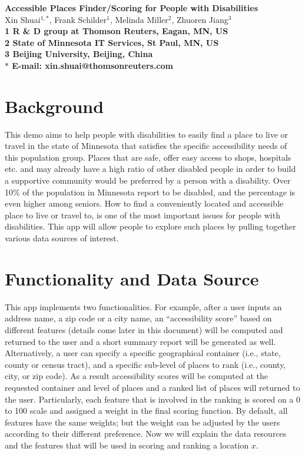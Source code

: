 \documentclass[10pt]{article}
\date{}
\begin{document}
\begin{flushleft}
{\Large
\textbf{Accessible Places Finder/Scoring for People with Disabilities}
}
\\
Xin Shuai$^{1,\ast}$,
Frank Schilder$^{1}$,
Melinda Miller$^{2}$,
Zhuoren Jiang$^{3}$
\\
\bf{1} R \& D group at Thomson Reuters, Eagan, MN, US
\\
\bf{2} State of Minnesota IT Services, St Paul, MN, US
\\
\bf{3} Beijing University, Beijing, China
\\
$\ast$ E-mail: xin.shuai@thomsonreuters.com
\end{flushleft}


\section{Background}
This demo aims to help people with disabilities to easily find a place to live or travel in the state of Minnesota that satisfies the specific accessibility needs of this population group. Places that are safe, offer easy access to shops, hospitals etc. and may already have a high ratio of other disabled people in order to build a supportive community would be preferred by a person with a disability. Over 10\% of the population in Minnesota report to be disabled, and the percentage is even higher among seniors. How to find a conveniently located and accessible place to live or travel to, is one of the most important issues for people with disabilities. This app will allow people to explore such places by pulling together various data sources of interest.

\section{Functionality and Data Source}
This app implements two functionalities. For example, after a user inputs an address name, a zip code or a city name, an ``accessibility score'' based on different features (details come later in this document) will be computed and returned to the user and a short summary report will be generated as well. Alternatively, a user can specify a specific geographical container (i.e., state, county or census tract), and a specific sub-level of places to rank (i.e., county, city, or zip code). As a result accessibility scores will be computed at the requested container and level of places and a ranked list of places will returned to the user. Particularly, each feature that is involved in the ranking is scored on a 0 to 100 scale and assigned a weight in the final scoring function. By default, all features have the same weights; but the weight can be adjusted by the users according to their different preference.
Now we will explain the data resources and the features that will be used in scoring and ranking a location $x$. 
\end{document}
